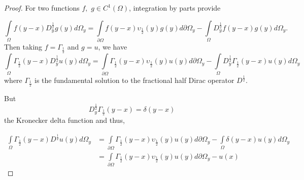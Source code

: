 \documentclass[10pt,a4paper]{amsart}
\numberwithin{equation}{section}
\begin{document}
\begin{proof}
For two functions $f,$ $g\in C^{1}\left(  \Omega\right)  $, integration by
parts provide%

\[%
{\displaystyle\int\limits_{\Omega}}
f\left(  y-x\right)  D_{y}^{\frac{1}{2}}g(y)d\Omega_{y}=%
{\displaystyle\int\limits_{\partial\Omega}}
f\left(  y-x\right)  \upsilon_{\frac{1}{2}}\left(  y\right)  g\left(
y\right)  d\partial\Omega_{y}-%
{\displaystyle\int\limits_{\Omega}}
D_{y}^{\frac{1}{2}}f\left(  y-x\right)  g\left(  y\right)  d\Omega_{y}.
\]
Then taking $f=\Gamma_{\frac{1}{2}}$ and $g=u$, we have
\[%
{\displaystyle\int\limits_{\Omega}}
\Gamma_{\frac{1}{2}}\left(  y-x\right)  D_{y}^{\frac{1}{2}}u(y)d\Omega_{y}=%
{\displaystyle\int\limits_{\partial\Omega}}
\Gamma_{\frac{1}{2}}\left(  y-x\right)  \upsilon_{\frac{1}{2}}\left(
y\right)  u\left(  y\right)  d\partial\Omega_{y}-%
{\displaystyle\int\limits_{\Omega}}
D_{y}^{\frac{1}{2}}\Gamma_{\frac{1}{2}}\left(  y-x\right)  u\left(  y\right)
d\Omega_{y}%
\]
where $\Gamma_{\frac{1}{2}}$ is the fundamental solution to the fractional
half Dirac operator $D^{\frac{1}{2}}$.

But
\[
D_{y}^{\frac{1}{2}}\Gamma_{\frac{1}{2}}\left(  y-x\right)  =\delta\left(
y-x\right)
\]
the Kronecker delta function and thus, \ %

\begin{align*}%
{\displaystyle\int\limits_{\Omega}}
\Gamma_{\frac{1}{2}}\left(  y-x\right)  D^{\frac{1}{2}}u(y)d\Omega_{y}  & =%
{\displaystyle\int\limits_{\partial\Omega}}
\Gamma_{\frac{1}{2}}\left(  y-x\right)  \upsilon_{\frac{1}{2}}\left(
y\right)  u\left(  y\right)  d\partial\Omega_{y}-%
{\displaystyle\int\limits_{\Omega}}
\delta\left(  y-x\right)  u\left(  y\right)  d\Omega_{y}\\
& =%
{\displaystyle\int\limits_{\partial\Omega}}
\Gamma_{\frac{1}{2}}\left(  y-x\right)  \upsilon_{\frac{1}{2}}\left(
y\right)  u\left(  y\right)  d\partial\Omega_{y}-u(x)
\end{align*}



\end{proof}
\end{document}
